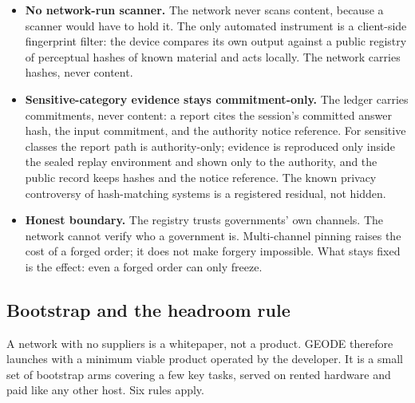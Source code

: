 \documentclass[11pt]{article}
\begin{document}
\begin{itemize}
reaches the threshold. And a record-only entry: when neither
trigger is met, the report is stored on the ledger and nothing
else changes.
\item \textbf{No network-run scanner.} The network never scans
content, because a scanner would have to hold it. The only
automated instrument is a client-side fingerprint filter: the
device compares its own output against a public registry of
perceptual hashes of known material and acts locally. The
network carries hashes, never content.
\item \textbf{Sensitive-category evidence stays
commitment-only.} The ledger carries commitments, never content:
a report cites the session's committed answer hash, the input
commitment, and the authority notice reference. For sensitive
classes the report path is authority-only; evidence is
reproduced only inside the sealed replay environment and shown
only to the authority, and the public record keeps hashes and
the notice reference. The known privacy controversy of
hash-matching systems is a registered residual, not hidden.
\item \textbf{Honest boundary.} The registry trusts
governments' own channels. The network cannot verify who a
government is. Multi-channel pinning raises the cost of a forged
order; it does not make forgery impossible. What stays fixed is
the effect: even a forged order can only freeze.
\end{itemize}

\subsection{Bootstrap and the headroom rule}\label{sec:bootstrap}

A network with no suppliers is a whitepaper, not a product. GEODE
therefore launches with a minimum viable product operated by the
developer. It is a small set of bootstrap arms covering a few key
tasks, served on rented hardware and paid like any other host. Six
rules apply.
\end{document}
